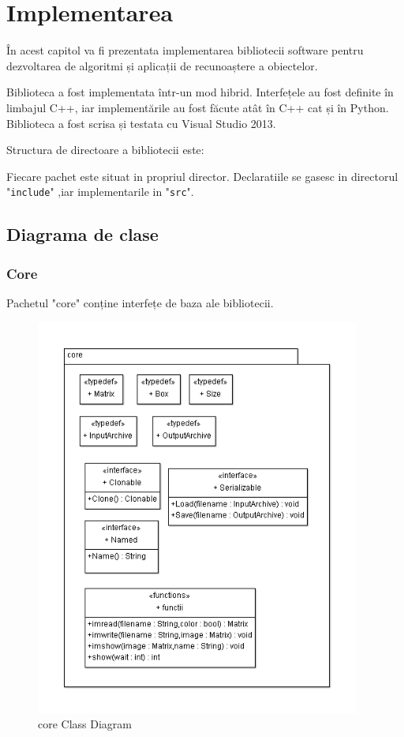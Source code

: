 \chapter{Implementarea}

În acest capitol va fi prezentata implementarea bibliotecii software pentru dezvoltarea de algoritmi și aplicații de recunoaștere a obiectelor.

Biblioteca a fost implementata într-un mod hibrid.
Interfețele au fost definite în limbajul C++, iar implementările au fost făcute atât în C++ cat și în Python.
Biblioteca a fost scrisa și testata cu Visual Studio 2013.


Structura de directoare a bibliotecii este:

Fiecare pachet este situat in propriul director.
Declaratiile se gasesc in directorul "\verb!include!"
,iar implementarile in "\verb!src!".

\pagebreak
\section{Diagrama de clase}

\subsection{Core}
Pachetul "core" conține interfețe de baza ale bibliotecii.
\begin{figure}[H]
	\centering
		\includegraphics[width=0.95\textwidth]{uml/coreClassDiagram.png}
	\caption{core Class Diagram}
	\label{fig:coreClassDiagram}
\end{figure}

